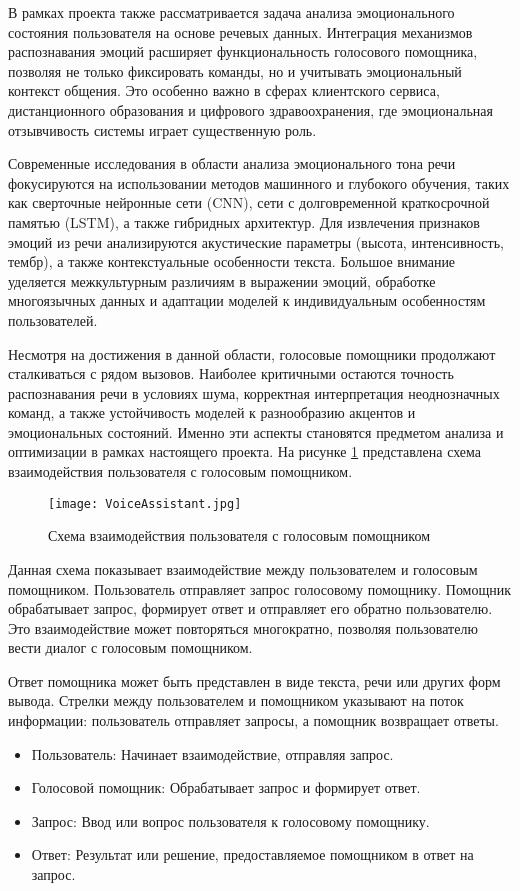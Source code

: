 В рамках проекта также рассматривается задача анализа эмоционального состояния пользователя на основе речевых данных. Интеграция механизмов распознавания эмоций расширяет функциональность голосового помощника, позволяя не только фиксировать команды, но и учитывать эмоциональный контекст общения. Это особенно важно в сферах клиентского сервиса, дистанционного образования и цифрового здравоохранения, где эмоциональная отзывчивость системы играет существенную роль.

Современные исследования в области анализа эмоционального тона речи фокусируются на использовании методов машинного и глубокого обучения, таких как сверточные нейронные сети (CNN), сети с долговременной краткосрочной памятью (LSTM), а также гибридных архитектур. Для извлечения признаков эмоций из речи анализируются акустические параметры (высота, интенсивность, тембр), а также контекстуальные особенности текста. Большое внимание уделяется межкультурным различиям в выражении эмоций, обработке многоязычных данных и адаптации моделей к индивидуальным особенностям пользователей.

Несмотря на достижения в данной области, голосовые помощники продолжают сталкиваться с рядом вызовов. Наиболее критичными остаются точность распознавания речи в условиях шума, корректная интерпретация неоднозначных команд, а также устойчивость моделей к разнообразию акцентов и эмоциональных состояний. Именно эти аспекты становятся предметом анализа и оптимизации в рамках настоящего проекта.
На рисунке \ref{fig:VoiceAssistant} представлена схема  взаимодействия пользователя с голосовым помощником.
 \begin{figure}[H]
 	\centering
 	\texttt{[image: VoiceAssistant.jpg]}
 	\caption{Схема взаимодействия пользователя с голосовым помощником}
 	\label{fig:VoiceAssistant}
 \end{figure}
 
 
 Данная схема показывает взаимодействие между пользователем и голосовым помощником. Пользователь отправляет запрос голосовому помощнику. Помощник обрабатывает запрос, формирует ответ и отправляет его обратно пользователю. Это взаимодействие может повторяться многократно, позволяя пользователю вести диалог с голосовым помощником.
 
 Ответ помощника может быть представлен в виде текста, речи или других форм вывода. Стрелки между пользователем и помощником указывают на поток информации: пользователь отправляет запросы, а помощник возвращает ответы.
 
 \begin{itemize}
 	\item Пользователь: Начинает взаимодействие, отправляя запрос.
 	\item Голосовой помощник: Обрабатывает запрос и формирует ответ.
 	\item Запрос: Ввод или вопрос пользователя к голосовому помощнику.
 	\item Ответ: Результат или решение, предоставляемое помощником в ответ на запрос.
 \end{itemize}
 
